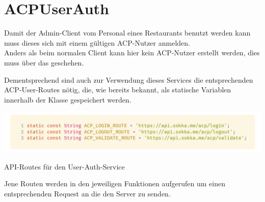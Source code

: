 \section{ACPUserAuth}

Damit der Admin-Client vom Personal eines Restaurants benutzt werden kann muss dieses sich mit 
einem gültigen ACP-Nutzer anmelden.\\
Anders als beim normalen Client kann hier kein ACP-Nutzer erstellt werden, dies muss über das
 geschehen.

Dementsprechend sind auch zur Verwendung dieses Services die entsprechenden ACP-User-Routes nötig,
die, wie bereits bekannt, als statische Variablen innerhalb der Klasse gespeichert werden.

\begin{code}[H]
    \centering
    \includegraphics[width=1\textwidth]{images/Admin-Client/services/acpuserauth/acproutes.png}
    \vspace{-25pt}
    \caption{API-Routes für den User-Auth-Service}
\end{code}

Jene Routen werden in den jeweiligen Funktionen aufgerufen um einen entsprechenden Request an
die den Server zu senden.